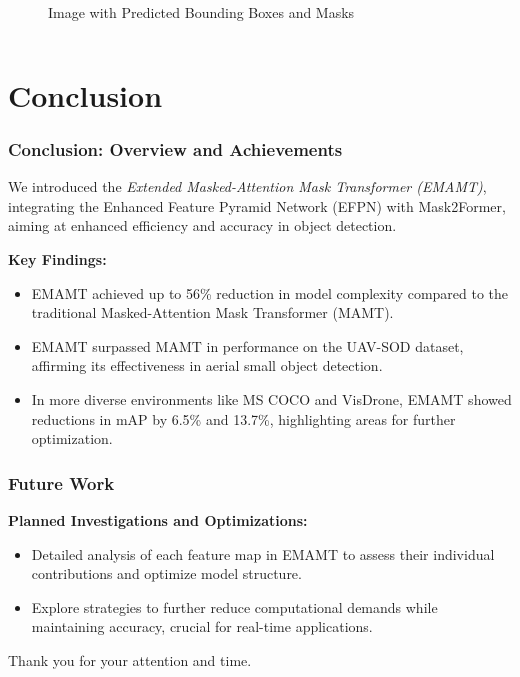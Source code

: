 \documentclass{beamer}
\begin{document}
\begin{frame}[t]
\begin{columns}
\begin{column}{0.5\textwidth}
\begin{figure}
        \caption{Image with Predicted Bounding Boxes and Masks}
        \label{fig:post-pre-process}
      \end{figure}
    \end{column}
  \end{columns}
\end{frame}


\section{Conclusion}
\begin{frame}[t]
  \frametitle{Conclusion: Overview and Achievements}
  We introduced the \textit{Extended Masked-Attention Mask Transformer (EMAMT)}, integrating the Enhanced Feature Pyramid Network (EFPN) with Mask2Former, aiming at enhanced efficiency and accuracy in object detection.

  \textbf{Key Findings:}
  \begin{itemize}
    \item EMAMT achieved up to 56\% reduction in model complexity compared to the traditional Masked-Attention Mask Transformer (MAMT).
    \item EMAMT surpassed MAMT in performance on the UAV-SOD dataset, affirming its effectiveness in aerial small object detection.
    \item In more diverse environments like MS COCO and VisDrone, EMAMT showed reductions in mAP by 6.5\% and 13.7\%, highlighting areas for further optimization.
  \end{itemize}
\end{frame}

\begin{frame}[t]
  \frametitle{Future Work}
  \textbf{Planned Investigations and Optimizations:}
  \begin{itemize}
    \item Detailed analysis of each feature map in EMAMT to assess their individual contributions and optimize model structure.
    \item Explore strategies to further reduce computational demands while maintaining accuracy, crucial for real-time applications.
  \end{itemize}
\end{frame}

\begin{frame}
  \centering
  \Large{Thank you for your attention and time.}
\end{frame}
\end{document}
